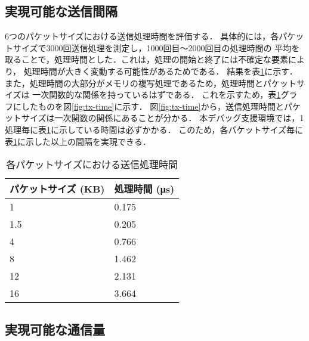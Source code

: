 \documentclass[submit,techreq,noauthor,dvipdfmx]{ipsj}
\begin{document}
\subsection{実現可能な送信間隔}\label{sec:interval}

6つのパケットサイズにおける送信処理時間を評価する．
具体的には，各パケットサイズで3000回送信処理を測定し，1000回目〜2000回目の処理時間の
平均を取ることで，処理時間とした．これは，処理の開始と終了には不確定な要素により，
処理時間が大きく変動する可能性があるためである．
結果を表\ref{tx-time}に示す．
また，処理時間の大部分がメモリの複写処理であるため，処理時間とパケットサイズは
一次関数的な関係を持っているはずである．
これを示すため，表\ref{tx-time}グラフにしたものを図\ref{fig:tx-time}に示す．
図\ref{fig:tx-time}から，送信処理時間とパケットサイズは一次関数の関係にあることが分かる．
本デバッグ支援環境では，1処理毎に表\ref{tx-time}に示している時間は必ずかかる．
このため，各パケットサイズ毎に表\ref{tx-time}に示した以上の間隔を実現できる．


\begin{table}[h]
    \caption{各パケットサイズにおける送信処理時間}
    \label{tx-time}
    \begin{center}
        \begin{tabular}{l|l}   \hline \hline 
            パケットサイズ (KB)      & 処理時間 (μs)    \\ \hline
            1                        & 0.175            \\
            1.5                      & 0.205            \\
            4                        & 0.766            \\
            8                        & 1.462            \\
            12                       & 2.131            \\
            16                       & 3.664            \\ \hline
        \end{tabular}
    \end{center}
\end{table}

\subsection{実現可能な通信量}\label{sec:interval}
\end{document}
